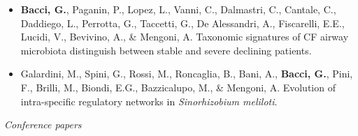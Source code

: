 \begin{itemize}


\item \textbf{Bacci, G.}, Paganin, P., Lopez, L., Vanni, C., Dalmastri, C., Cantale, C., Daddiego, L., Perrotta, G., Taccetti, G., De Alessandri, A., Fiscarelli, E.E., Lucidi, V., Bevivino, A., \& Mengoni, A. Taxonomic signatures of CF airway microbiota distinguish between stable and severe declining patients.

\item Galardini, M., Spini, G., Rossi, M., Roncaglia, B., Bani, A., \textbf{Bacci, G.}, Pini, F., Brilli, M., Biondi, E.G., Bazzicalupo, M., \& Mengoni, A. Evolution of intra-specific regulatory networks in \textit{Sinorhizobium meliloti}.


\end{itemize}


\textit{Conference papers}

